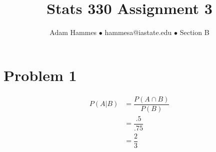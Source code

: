 \documentclass[11pt]{article}
\begin{document}
\title{Stats 330 Assignment 3}
\author{Adam Hammes $\bullet$ hammesa@iastate.edu $\bullet$ Section B}
\maketitle

\section*{Problem 1}
\begin{align*}
P(A|B) &= \dfrac{P(A \cap B)}{P(B)} \\
&= \dfrac{.5}{.75} \\
&= \dfrac{2}{3}
\end{align*}
\end{document}
